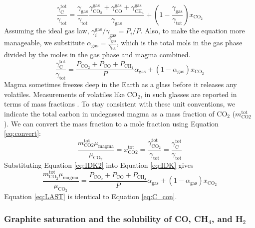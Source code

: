 \begin{equation} 
    \frac{\gamma_\mathrm{C}^\mathrm{tot}}{\gamma_\mathrm{tot}} = \frac{\gamma_\mathrm{gas}}{\gamma_\mathrm{tot}}\frac{\gamma_\mathrm{CO_2}^\mathrm{gas}+\gamma_\mathrm{CO}^\mathrm{gas}+\gamma_\mathrm{CH_4}^\mathrm{gas}}{\gamma_\mathrm{gas}} + \left(1-\frac{\gamma_\mathrm{gas}}{\gamma_\mathrm{tot}}\right)x_\mathrm{CO_2}
\end{equation}
Assuming the ideal gas law, $\gamma_i^\mathrm{gas}/\gamma_\mathrm{gas}=P_i/P$. Also, to make the equation more manageable, we substitute $\alpha_\mathrm{gas}=\frac{\gamma_\mathrm{gas}}{\gamma_\mathrm{tot}}$, which is the total mols in the gas phase divided by the moles in the gas phase and magma combined.
\begin{equation} \label{eq:IDK}
    \frac{\gamma_\mathrm{C}^\mathrm{tot}}{\gamma_\mathrm{tot}} = \frac{P_\mathrm{CO_2}+P_\mathrm{CO}+P_\mathrm{CH_4}}{P}\alpha_\mathrm{gas} + \left(1-\alpha_\mathrm{gas}\right)x_\mathrm{CO_2}
\end{equation}
Magma sometimes freezes deep in the Earth as a glass before it releases any volatiles. Measurements of volatiles like CO$_2$, in such glasses are reported in terms of mass fractions \citep{Wallace_2015}. To stay consistent with these unit conventions, we indicate the total carbon in undegassed magma as a mass fraction of CO$_2$ ($m_\mathrm{CO2}^\mathrm{tot}$). We can convert the mass fraction to a mole fraction using Equation \eqref{eq:convert}:
\begin{equation} \label{eq:IDK2}
    \frac{m_\mathrm{CO2}^\mathrm{tot}\mu_\mathrm{magma}}{\mu_\mathrm{CO_2}}=x_\mathrm{CO2}^\mathrm{tot}=\frac{\gamma_\mathrm{CO_2}^\mathrm{tot}}{\gamma_\mathrm{tot}}=\frac{\gamma_\mathrm{C}^\mathrm{tot}}{\gamma_\mathrm{tot}}
\end{equation}
Substituting Equation \eqref{eq:IDK2} into Equation \eqref{eq:IDK} gives 
\begin{equation} \label{eq:LAST}
    {\frac{{m_{{\text{C}}{{\text{O}}_{\text{2}}}}^{{\text{tot}}}}\mu_\mathrm{magma}}{{{\mu_{{\text{C}}{{\text{O}}_{\text{2}}}}}}}} = \frac{{{P_{{\text{C}}{{\text{O}}_{\text{2}}}}} + {P_{{\text{CO}}}} + {P_{{\text{C}}{{\text{H}}_{\text{4}}}}}}}{P}{\alpha _{{\text{gas}}}} + (1 - {\alpha _{{\text{gas}}}}){x_{{\text{C}}{{\text{O}}_{\text{2}}}}}
\end{equation}
Equation \eqref{eq:LAST} is identical to Equation \eqref{eq:C_con}.

\subsubsection{Graphite saturation and the solubility of CO, CH$_4$, and H$_2$} \label{sec:graphite_sat}

